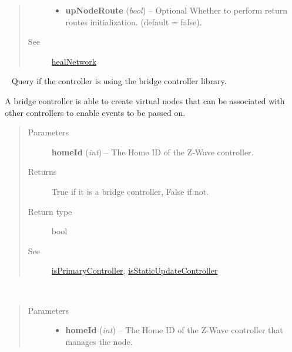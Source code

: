 \documentclass[letterpaper,10pt,english]{sphinxmanual}
\begin{document}
\begin{fulllineitems}
\begin{fulllineitems}
\begin{quote}
\begin{description}
\begin{itemize}
\item {} 
\textbf{upNodeRoute} (\emph{bool}) -- Optional Whether to perform return routes initialization. (default = false).

\end{itemize}

\item[{See}] \leavevmode
{\hyperref[libopenzwave:healnetwork]{healNetwork}}

\end{description}\end{quote}

\end{fulllineitems}


\begin{fulllineitems}
\label{libopenzwave:libopenzwave.PyManager.isBridgeController}~\label{libopenzwave:isbridgecontroller}
Query if the controller is using the bridge controller library.

A bridge controller is able to create virtual nodes that can be associated
with other controllers to enable events to be passed on.
\begin{quote}\begin{description}
\item[{Parameters}] \leavevmode
\textbf{homeId} (\emph{int}) -- The Home ID of the Z-Wave controller.

\item[{Returns}] \leavevmode
True if it is a bridge controller, False if not.

\item[{Return type}] \leavevmode
bool

\item[{See}] \leavevmode
{\hyperref[libopenzwave:isprimarycontroller]{isPrimaryController}}, {\hyperref[libopenzwave:isstaticupdatecontroller]{isStaticUpdateController}}

\end{description}\end{quote}

\end{fulllineitems}


\begin{fulllineitems}
\label{libopenzwave:libopenzwave.PyManager.isNodeAwake}~\begin{quote}\begin{description}
\item[{Parameters}] \leavevmode\begin{itemize}
\item {} 
\textbf{homeId} (\emph{int}) -- The Home ID of the Z-Wave controller that manages the node.


\end{itemize}
\end{description}
\end{quote}
\end{fulllineitems}
\end{fulllineitems}
\end{document}
